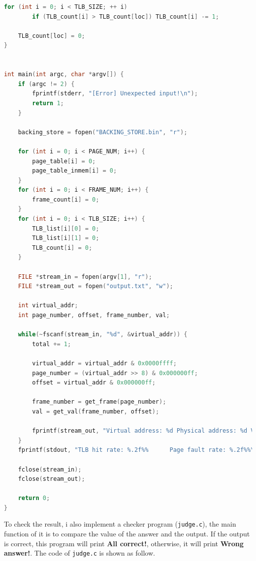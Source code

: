 \documentclass[UTF8,10pt,a4paper]{article}
\theoremstyle{Problem}
\theoremstyle{Solution}
\begin{document}
\begin{lstlisting}[language = c]
    for (int i = 0; i < TLB_SIZE; ++ i)
		if (TLB_count[i] > TLB_count[loc]) TLB_count[i] -= 1;

	TLB_count[loc] = 0;
}


int main(int argc, char *argv[]) {
    if (argc != 2) {
        fprintf(stderr, "[Error] Unexpected input!\n");
		return 1;
    }

    backing_store = fopen("BACKING_STORE.bin", "r");

    for (int i = 0; i < PAGE_NUM; i++) {
        page_table[i] = 0;
        page_table_inmem[i] = 0;
    }
    for (int i = 0; i < FRAME_NUM; i++) {
        frame_count[i] = 0;
    }
    for (int i = 0; i < TLB_SIZE; i++) {
        TLB_list[i][0] = 0;
        TLB_list[i][1] = 0;
        TLB_count[i] = 0;
    }

	FILE *stream_in = fopen(argv[1], "r");
	FILE *stream_out = fopen("output.txt", "w");

    int virtual_addr;
    int page_number, offset, frame_number, val;

    while(~fscanf(stream_in, "%d", &virtual_addr)) {
        total += 1;

        virtual_addr = virtual_addr & 0x0000ffff;
        page_number = (virtual_addr >> 8) & 0x000000ff;
		offset = virtual_addr & 0x000000ff;

        frame_number = get_frame(page_number);
        val = get_val(frame_number, offset);

        fprintf(stream_out, "Virtual address: %d Physical address: %d Value: %d\n", virtual_addr, (frame_number << 8) + offset, val);
    }
    fprintf(stdout, "TLB hit rate: %.2f%%      Page fault rate: %.2f%%\n", 100.0 * tlb_hit / total, 100.0 * page_fault / total);

    fclose(stream_in);
    fclose(stream_out);
    
    return 0;
}
\end{lstlisting}


To check the result, i also implement a checker program (\texttt{judge.c}), the main function of it is to compare the value of the answer and the output. If the output is correct, this program will print \textbf{All correct!}, otherwise, it will print \textbf{Wrong answer!}. The code of \texttt{judge.c} is shown as follow.
\end{document}
